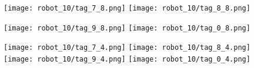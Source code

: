 \documentclass{article}
\begin{document}
\begin{figure}[h]
\texttt{[image: robot\_10/tag\_7\_8.png]} 
\texttt{[image: robot\_10/tag\_8\_8.png]} 


\texttt{[image: robot\_10/tag\_9\_8.png]} 
\texttt{[image: robot\_10/tag\_0\_8.png]} 


\texttt{[image: robot\_10/tag\_7\_4.png]} 
\texttt{[image: robot\_10/tag\_8\_4.png]} 
\texttt{[image: robot\_10/tag\_9\_4.png]} 
\texttt{[image: robot\_10/tag\_0\_4.png]} 

\end{figure}
\end{document}
